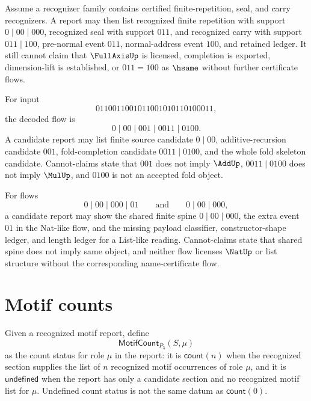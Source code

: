 \begin{example}
\label{ex:motif-report-recognized-completion}
Assume a recognizer family contains certified finite-repetition, seal, and carry recognizers. A report may then list recognized finite repetition with support $0\mid 00\mid 000$, recognized seal with support $011$, and recognized carry with support $011\mid 100$, pre-normal event $011$, normal-address event $100$, and retained ledger. It still cannot claim that $\FullAxisUp$ is licensed, completion is exported, dimension-lift is established, or $011=\!100$ as $\hsame$ without further certificate flows.
\end{example}

\begin{example}
\label{ex:motif-report-candidate-fold}
For input
$$
  0110011001011001010110100011,
$$
the decoded flow is
$$
  0\mid 00\mid 001\mid 0011\mid 0100.
$$
A candidate report may list finite source candidate $0\mid 00$, additive-recursion candidate $001$, fold-completion candidate $0011\mid 0100$, and the whole fold skeleton candidate. Cannot-claims state that $001$ does not imply $\AddUp$, $0011\mid 0100$ does not imply $\MulUp$, and $0100$ is not an accepted fold object.
\end{example}

\begin{example}
\label{ex:motif-report-nat-list-comparison}
For flows
$$
  0\mid 00\mid 000\mid 01
  \qquad\text{and}\qquad
  0\mid 00\mid 000,
$$
a candidate report may show the shared finite spine $0\mid 00\mid 000$, the extra event $01$ in the Nat-like flow, and the missing payload classifier, constructor-shape ledger, and length ledger for a List-like reading. Cannot-claims state that shared spine does not imply same object, and neither flow licenses $\NatUp$ or list structure without the corresponding name-certificate flow.
\end{example}

\section{Motif counts}
\label{sec:motif-report-counts}

\begin{definition}
\label{def:motif-report-motif-count}
Given a recognized motif report, define
$$
  \mathsf{MotifCount}_{P_3}(S,\mu)
$$
as the count status for role $\mu$ in the report: it is $\mathsf{count}(n)$ when the recognized section supplies the list of $n$ recognized motif occurrences of role $\mu$, and it is $\mathsf{undefined}$ when the report has only a candidate section and no recognized motif list for $\mu$. Undefined count status is not the same datum as $\mathsf{count}(0)$.
\end{definition}

